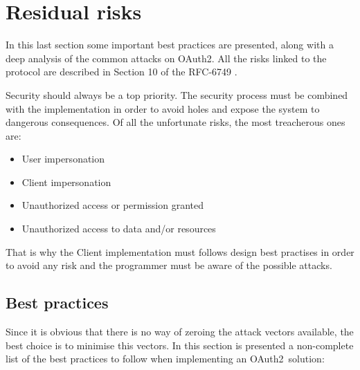\documentclass[a4paper,12pt]{article}
\def\oauth{OAuth2\xspace}
\def\rfc#1{RFC-#1\xspace}
\begin{document}
\section{Residual risks}
In this last section some important best practices are presented, along with a deep analysis of the common attacks on \oauth. All the risks linked to the protocol are described in Section 10 of the \rfc{6749} \cite{RFC6749}.

Security should always be a top priority. The security process must be combined with the implementation in order to avoid holes and expose the system to dangerous consequences.
Of all the unfortunate risks, the most treacherous ones are:

\begin{itemize}
    \item User impersonation
    \item Client impersonation
    \item Unauthorized access or permission granted
    \item Unauthorized access to data and/or resources
\end{itemize}

That is why the Client implementation must follows design best practises in order to avoid any risk and the programmer must be aware of the possible attacks.

\subsection{Best practices}
Since it is obvious that there is no way of zeroing the attack vectors available, the best choice is to minimise this vectors. In this section is presented a non-complete list of the best practices to follow when implementing an \oauth\ solution: 
\end{document}
